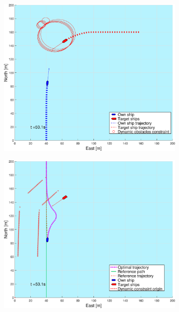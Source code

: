 \begin{figure}[ht!]
\begin{subfigure}[b]{0.494\textwidth}
        \subcaption{}
    \end{subfigure}
    \hfill
    \\
    \begin{subfigure}[b]{0.494\textwidth}
        \centering
        \includegraphics[width=\textwidth]{Images/Figures/sving_HO/_Simple_0fig1_time=50}
        \subcaption{}
    \end{subfigure}
    \hfill
    \begin{subfigure}[b]{0.494\textwidth}
        \centering
        \includegraphics[width=\textwidth]{Images/Figures/sving_HO/_Simple_0fig999_time=50}

\end{subfigure}
\end{figure}
